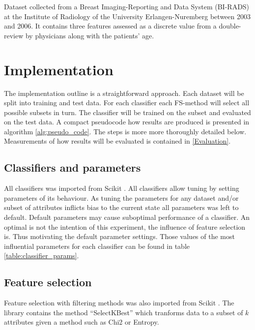 Dataset collected from a Breast Imaging-Reporting and Data System (BI-RADS) at the Institute of Radiology of the University Erlangen-Nuremberg between 2003 and 2006. It contains three features assessed as a discrete value from a double-review by physicians along with the patients' age.




\section{Implementation}

The implementation outline is a straightforward approach. Each dataset will be split into training and test data. For each classifier each FS-method will select all possible subsets in turn. The classifier will be trained on the subset and evaluated on the test data. A compact pseudocode how results are produced is presented in algorithm \ref{alg:pseudo_code}. The steps is more more thoroughly detailed below. Measurements of how results will be evaluated is contained in \ref{Evaluation}.



\subsection{Classifiers and parameters}
All classifiers was imported from Scikit \parencite{scikit-learn}. All classifiers allow tuning by setting parameters of its behaviour. As tuning the parameters for any dataset and/or subset of attributes inflicts bias to the current state all parameters was left to default. Default parameters may cause suboptimal performance of a classifier. An optimal is not the intention of this experiment, the influence of feature selection is. Thus motivating the default parameter settings. Those values of the most influential parameters for each classifier can be found in table \ref{table:classifier_params}.



\subsection{Feature selection}

Feature selection with filtering methods was also imported from  Scikit \parencite{scikit-learn}. The library contains the method ``SelectKBest'' which tranforms data to a subset of $k$ attributes given a method such as Chi2 or Entropy.

